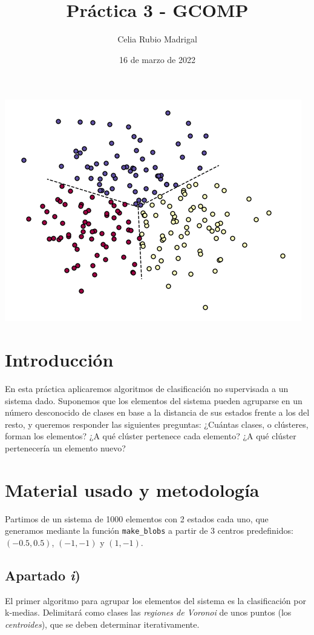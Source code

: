 \documentclass[a4paper]{article}
\author{Celia Rubio Madrigal}
\title{Práctica 3 - GCOMP}
\date{16 de marzo de 2022}
\begin{document}
	\maketitle
	
	\tableofcontents
	
	\vfill
	
	\begin{center}
			\includegraphics[width=0.66\linewidth]{portada}
	\end{center}
	
	
	\vfill
	\newpage
	
	\section{Introducción}
	En esta práctica aplicaremos algoritmos de clasificación no supervisada a un sistema dado. Suponemos que los elementos del sistema pueden agruparse en un número desconocido de clases en base a la distancia de sus estados frente a los del resto, y queremos responder las siguientes preguntas:
		¿Cuántas clases, o clústeres, forman los elementos?
		¿A qué clúster pertenece cada elemento?
		¿A qué clúster pertenecería un elemento nuevo?
	
	\section{Material usado y metodología}
	Partimos de un sistema de 1000 elementos con 2 estados cada uno, que generamos mediante la función \verb|make_blobs| a partir de 3 centros predefinidos: $(-0.5, 0.5)$, $(-1, -1)$ y $(1, -1)$.
	
	
	\subsection{Apartado \textit{i})}
	El primer algoritmo para agrupar los elementos del sistema es la clasificación por k-medias. Delimitará como clases las \textit{regiones de Voronoi} de unos puntos (los \textit{centroides}), que se deben determinar iterativamente.
	
\end{document}
